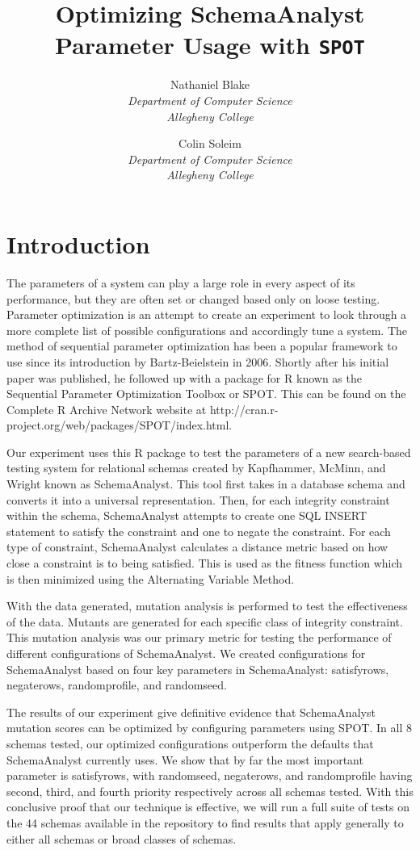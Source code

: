 \documentclass[a4paper,twocolumn]{article}
\title{Optimizing SchemaAnalyst Parameter Usage with \texttt{SPOT}}
\author{Nathaniel Blake \\ \textit{Department of Computer Science} \\ \textit{Allegheny College} \and Colin Soleim \\ \textit{Department of Computer Science} \\ \textit{Allegheny College}}
\date{}
\begin{document}
\maketitle

\section{Introduction}

The parameters of a system can play a large role in every aspect of its performance, but they are often set or changed based only on loose testing. Parameter optimization is an attempt to create an experiment to look through a more complete list of possible configurations and accordingly tune a system. The method of sequential parameter optimization has been a popular framework to use since its introduction by Bartz-Beielstein in 2006. Shortly after his initial paper was published, he followed up with a package for R known as the Sequential Parameter Optimization Toolbox or SPOT. This can be found on the Complete R Archive Network website at http://cran.r-project.org/web/packages/SPOT/index.html. 

Our experiment uses this R package to test the parameters of a new search-based testing system for relational schemas created by Kapfhammer, McMinn, and Wright known as SchemaAnalyst. This tool first takes in a database schema and converts it into a universal representation. Then, for each integrity constraint within the schema, SchemaAnalyst attempts to create one SQL INSERT statement to satisfy the constraint and one to negate the constraint. For each type of constraint, SchemaAnalyst calculates a distance metric based on how close a constraint is to being satisfied. This is used as the fitness function which is then minimized using the Alternating Variable Method. 

With the data generated, mutation analysis is performed to test the effectiveness of the data. Mutants are generated for each specific class of integrity constraint. This mutation analysis was our primary metric for testing the performance of different configurations of SchemaAnalyst. We created configurations for SchemaAnalyst based on four key parameters in SchemaAnalyst: satisfyrows, negaterows, randomprofile, and randomseed.

The results of our experiment give definitive evidence that SchemaAnalyst mutation scores can be optimized by configuring parameters using SPOT. In all 8 schemas tested, our optimized configurations outperform the defaults that SchemaAnalyst currently uses. We show that by far the most important parameter is satisfyrows, with randomseed, negaterows, and randomprofile having second, third, and fourth priority respectively across all schemas tested. With this conclusive proof that our technique is effective, we will run a full suite of tests on the 44 schemas available in the repository to find results that apply generally to either all schemas or broad classes of schemas. 
\end{document}
